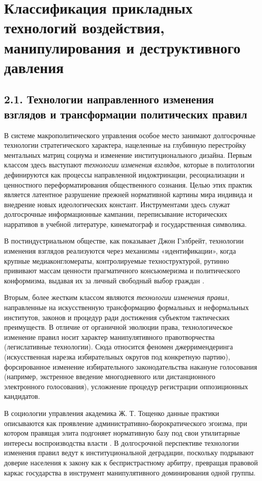 \section{Классификация прикладных технологий воздействия, манипулирования и деструктивного давления}

\subsection{2.1. Технологии направленного изменения взглядов и трансформации политических правил}

В системе макрополитического управления особое место занимают долгосрочные технологии стратегического характера, нацеленные на глубинную перестройку ментальных матриц социума и изменение институционального дизайна. Первым классом здесь выступают \textit{технологии изменения взглядов}, которые в политологии дефинируются как процессы направленной индоктринации, ресоциализации и ценностного переформатирования общественного сознания. Целью этих практик является латентное разрушение прежней нормативной картины мира индивида и внедрение новых идеологических констант. Инструментами здесь служат долгосрочные информационные кампании, переписывание исторических нарративов в учебной литературе, кинематограф и государственная символика. 

В постиндустриальном обществе, как показывает Джон Гэлбрейт, технологии изменения взглядов реализуются через механизмы «идентификации», когда крупные медиаконгломераты, контролируемые техноструктурой, рутинно прививают массам ценности прагматичного консьюмеризма и политического конформизма, выдавая их за личный свободный выбор граждан \cite{Gelbreyt}.

Вторым, более жестким классом являются \textit{технологии изменения правил}, направленные на искусственную трансформацию формальных и неформальных институтов, законов и процедур ради достижения субъектом тактических преимуществ. В отличие от органичной эволюции права, технологическое изменение правил носит характер манипулятивного правотворчества (легислативные технологии). Сюда относится феномен джерримендеринга (искусственная нарезка избирательных округов под конкретную партию), форсированное изменение избирательного законодательства накануне голосования (например, экстренное введение многодневного или дистанционного электронного голосования), усложнение процедур регистрации оппозиционных кандидатов.

В социологии управления академика Ж. Т. Тощенко данные практики описываются как проявление административно-бюрократического эгоизма, при котором правящая элита подгоняет нормативную базу под свои утилитарные интересы воспроизводства власти \cite{Toschenko}. В долгосрочной перспективе технологии изменения правил ведут к институциональной деградации, поскольку подрывают доверие населения к закону как к беспристрастному арбитру, превращая правовой каркас государства в инструмент манипулятивного доминирования одной группы.

